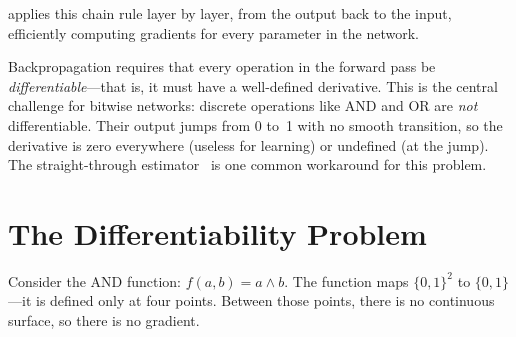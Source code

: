  applies this chain rule layer by layer, from
the output back to the input, efficiently computing gradients for every
parameter in the network.

\begin{engineernote}
Backpropagation requires that every operation in the forward pass be
\emph{differentiable}---that is, it must have a well-defined
derivative. This is the central challenge for bitwise networks:
discrete operations like AND and OR are \emph{not} differentiable.
Their output jumps from 0 to~1 with no smooth transition, so the
derivative is zero everywhere (useless for learning) or undefined
(at the jump). The straight-through estimator~\cite{bengio2013ste} is one common
workaround for this problem.
\end{engineernote}


\section{The Differentiability Problem}
\label{sec:diff-problem}

Consider the AND function: $f(a, b) = a \wedge b$. The function maps
$\{0,1\}^2$ to $\{0,1\}$---it is defined only at four points. Between
those points, there is no continuous surface, so there is no gradient.

